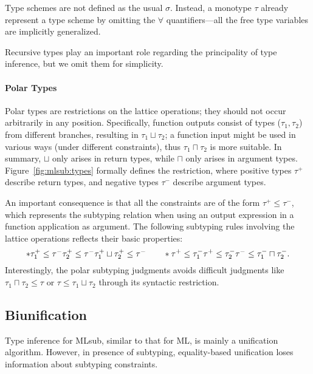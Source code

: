 Type schemes are not defined as the usual $\sigma$.
Instead, a monotype $\tau$ already represent a type scheme by
omitting the $\forall$ quantifiers---all the
free type variables are implicitly generalized.

Recursive types play an important role regarding the principality of type inference,
but we omit them for simplicity.

\paragraph{Polar Types}
Polar types are restrictions on the lattice operations;
they should not occur arbitrarily in any position.
Specifically, function outputs consist of types ($\tau_1, \tau_2$) from different branches,
resulting in $\tau_1 \sqcup \tau_2$;
a function input might be used in various ways (under different constraints),
thus $\tau_1 \sqcap \tau_2$ is more suitable.
In summary, $\sqcup$ only arises in return types,
while $\sqcap$ only arises in argument types.
Figure~\ref{fig:mlsub:types} formally defines the restriction,
where positive types $\tau^+$ describe return types,
and negative types $\tau^-$ describe argument types.

An important consequence is that all the constraints are of the form
$\tau^+ \le \tau^-$, which represents the subtyping relation when
using an output expression in a function application as argument.
The following subtyping rules involving the lattice operations
reflects their basic properties:
\[
    *
        {\tau_1^+ \le \tau^- \\ \tau_2^+ \le \tau^-}
        {\tau_1^+ \sqcup \tau_2^+ \le \tau^-}
    \qquad
    *
        {\tau^+ \le \tau_1^- \\ \tau^+ \le \tau_2^-}
        {\tau^- \le \tau_1^- \sqcap \tau_2^-}
    .
\]
Interestingly, the polar subtyping judgments avoids difficult judgments like
$\tau_1 \sqcap \tau_2 \le \tau$ or $\tau \le \tau_1 \sqcup \tau_2$
through its syntactic restriction.



\subsection{Biunification}

Type inference for MLsub, similar to that for ML, is mainly a unification algorithm.
However, in presence of subtyping,
equality-based unification loses information about subtyping constraints.

